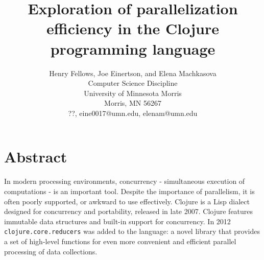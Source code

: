 \documentclass[12pt]{article}
\newcommand{\comment}[1]{{\bf \tt  {#1}}}
\newcommand{\clocode}[1]{{\texttt {#1}}}
\begin{document}
\pagestyle{plain}
%




\title{Exploration of parallelization efficiency in the Clojure programming language}
%
%




\author{
Henry Fellows, Joe Einertson, and Elena Machkasova \\
Computer Science Discipline \\
University of Minnesota Morris\\
Morris, MN 56267\\
??, eine0017@umn.edu, elenam@umn.edu
}




\date{}




\maketitle
\thispagestyle{empty}


\section*{\centering Abstract}
In modern processing environments, concurrency - simultaneous execution of computations - is an important tool. %
Despite the importance of parallelism, it is often poorly supported, or awkward to use effectively. Clojure is a Lisp dialect designed for concurrency and portability, 
released in late 2007. Clojure features immutable data structures and built-in support for concurrency. %
In 2012 \clocode{clojure.core.reducers} was added to the language: a novel library that provides a set of high-level functions for even more convenient and efficient parallel processing of data collections. 
\end{document}
